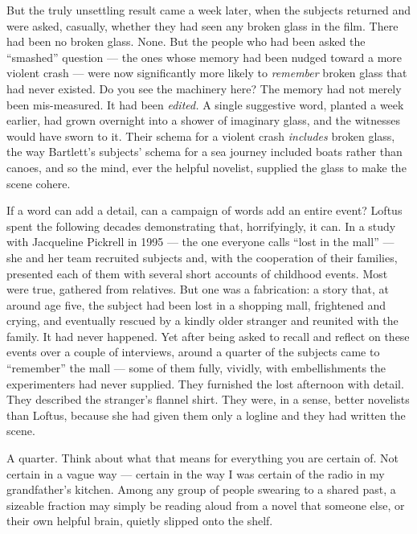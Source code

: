 But the truly unsettling result came a week later, when the subjects returned and were asked, casually, whether they had seen any broken glass in the film. There had been no broken glass. None. But the people who had been asked the ``smashed'' question — the ones whose memory had been nudged toward a more violent crash — were now significantly more likely to \emph{remember} broken glass that had never existed. Do you see the machinery here? The memory had not merely been mis-measured. It had been \emph{edited.} A single suggestive word, planted a week earlier, had grown overnight into a shower of imaginary glass, and the witnesses would have sworn to it. Their schema for a violent crash \emph{includes} broken glass, the way Bartlett's subjects' schema for a sea journey included boats rather than canoes, and so the mind, ever the helpful novelist, supplied the glass to make the scene cohere.

If a word can add a detail, can a campaign of words add an entire event? Loftus spent the following decades demonstrating that, horrifyingly, it can. In a study with Jacqueline Pickrell in 1995 — the one everyone calls ``lost in the mall'' — she and her team recruited subjects and, with the cooperation of their families, presented each of them with several short accounts of childhood events. Most were true, gathered from relatives. But one was a fabrication: a story that, at around age five, the subject had been lost in a shopping mall, frightened and crying, and eventually rescued by a kindly older stranger and reunited with the family. It had never happened. Yet after being asked to recall and reflect on these events over a couple of interviews, around a quarter of the subjects came to ``remember'' the mall — some of them fully, vividly, with embellishments the experimenters had never supplied. They furnished the lost afternoon with detail. They described the stranger's flannel shirt. They were, in a sense, better novelists than Loftus, because she had given them only a logline and they had written the scene.

A quarter. Think about what that means for everything you are certain of. Not certain in a vague way — certain in the way I was certain of the radio in my grandfather's kitchen. Among any group of people swearing to a shared past, a sizeable fraction may simply be reading aloud from a novel that someone else, or their own helpful brain, quietly slipped onto the shelf.

